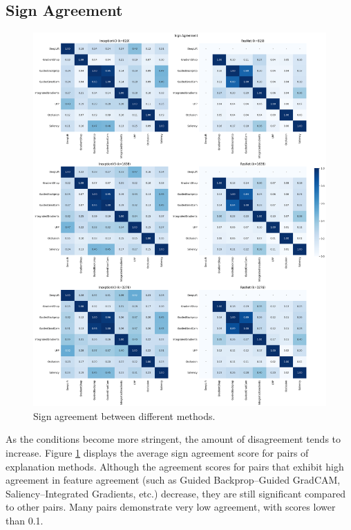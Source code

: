 \subsection{Sign Agreement}
\label{subsec:signAgreement}
\begin{figure}[t]
    \centering
    \includegraphics[width=\textwidth]{images/results/pneumothorax/sa.png}
    \caption{Sign agreement between different methods.}
    \label{fig:signAgreement}
\end{figure}

As the conditions become more stringent, the amount of disagreement tends to increase. Figure \ref{fig:signAgreement} displays the average sign agreement score for pairs of explanation methods. Although the agreement scores for pairs that exhibit high agreement in feature agreement (such as Guided Backprop--Guided GradCAM, Saliency--Integrated Gradients, etc.) decrease, they are still significant compared to other pairs. Many pairs demonstrate very low agreement, with scores lower than 0.1.

